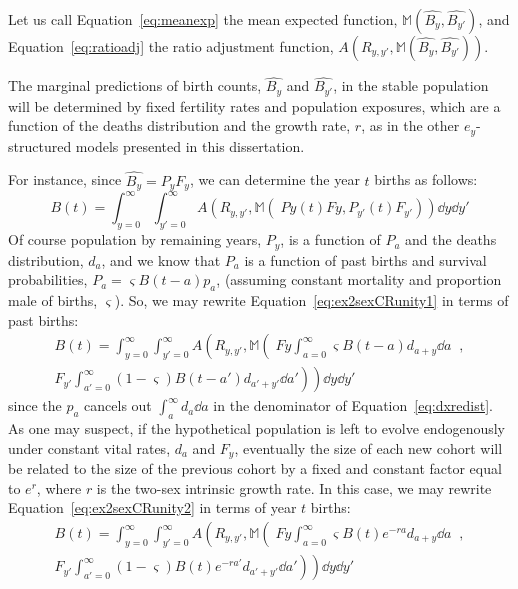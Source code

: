 Let us call Equation~\eqref{eq:meanexp} the mean
expected function, $\mathbb{M}(\widehat{B_y}, \widehat{B_{y'}})$, and
Equation~\eqref{eq:ratioadj} the ratio adjustment function, 
$A(R_{y,y'},\mathbb{M}(\widehat{B_y}, \widehat{B_{y'}}))$.

The marginal predictions of birth counts, $\widehat{B_y}$ and
$\widehat{B_{y'}}$, in the stable population will be determined by
fixed fertility rates and population exposures, which are a function of the
deaths distribution and the growth rate, $r$, as in the other $e_y$-structured 
models presented in this dissertation. 

For instance, since $\widehat{B_y} = P_yF_y$, we can determine the year $t$
births as follows:
\begin{equation}
\label{eq:ex2sexCRunity1}
B(t) = \int_{y=0}^\infty \int_{y'=0}^\infty
A\left(R_{y,y'},\mathbb{M}\left(\;Py(t)Fy, P_{y'}(t)F_{y'} \right)\right) \dd y
\dd y'
\end{equation} 
Of course population by remaining years, $P_y$, is a function of $P_a$ and the
deaths distribution, $d_a$, and we know that $P_a$ is a function of past births
and survival probabilities, $P_a = \varsigma B(t-a)p_a$, (assuming constant
mortality and proportion male of births, $\varsigma$). So, we may rewrite
Equation~\eqref{eq:ex2sexCRunity1} in terms of past births:
\begin{equation}
\label{eq:ex2sexCRunity2}
\begin{split}
B(t) = \int_{y=0}^\infty \int_{y'=0}^\infty
A\left(R_{y,y'},\mathbb{M}\left(\;Fy \int_{a=0}^\infty\varsigma
B(t-a)d_{a+y}\dd a\;\;,\right. \right. \\\left.
\left.F_{y'}\int_{a'=0}^\infty(1-\varsigma) B(t-a')d_{a'+y'} \dd a'\right)\right) \dd y \dd y'
\end{split}
\end{equation}
since the $p_a$ cancels out $\int _a^\infty d_a \dd a$ in the denominator of
Equation~\eqref{eq:dxredist}. As one may suspect, if the hypothetical
population is left to evolve endogenously under constant vital rates, $d_a$
and $F_y$, eventually the size of each new cohort will be related to the size
of the previous cohort by a fixed and constant factor equal to $e^r$, where
$r$ is the two-sex intrinsic growth rate. In this case, we may rewrite
Equation~\eqref{eq:ex2sexCRunity2} in terms of year $t$ births:
\begin{equation}
\label{eq:ex2sexCRunity3}
\begin{split}
B(t) = \int_{y=0}^\infty \int_{y'=0}^\infty
A\left(R_{y,y'},\mathbb{M}\left(\;Fy \int_{a=0}^\infty\varsigma
B(t)e^{-ra}d_{a+y}\dd a\right. \right.\;\;, \\ \left.
\left.F_{y'}\int_{a'=0}^\infty(1-\varsigma) B(t)e^{-ra'}d_{a'+y'} \dd a'\right)\right) \dd y \dd y'
\end{split}
\end{equation}
